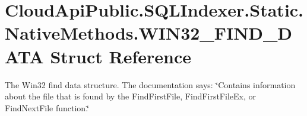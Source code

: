 \hypertarget{struct_cloud_api_public_1_1_s_q_l_indexer_1_1_static_1_1_native_methods_1_1_w_i_n32___f_i_n_d___d_a_t_a}{\section{Cloud\-Api\-Public.\-S\-Q\-L\-Indexer.\-Static.\-Native\-Methods.\-W\-I\-N32\-\_\-\-F\-I\-N\-D\-\_\-\-D\-A\-T\-A Struct Reference}
\label{struct_cloud_api_public_1_1_s_q_l_indexer_1_1_static_1_1_native_methods_1_1_w_i_n32___f_i_n_d___d_a_t_a}
}


The Win32 find data structure. The documentation says\-: \char`\"{}\-Contains information about the file that is found by the Find\-First\-File, Find\-First\-File\-Ex, or Find\-Next\-File function.\char`\"{}  


